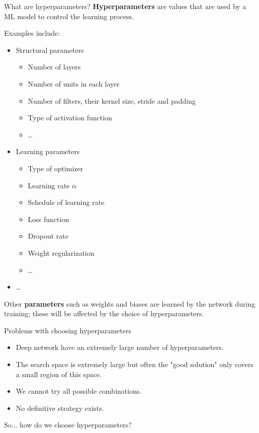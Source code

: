 \documentclass[9pt, aspectratio=169]{beamer}
\begin{document}
\begin{frame}
    {What are hyperparameters?}
    \textbf{Hyperparameters} are values that are used by a ML model to control the learning process.

    Examples include:
    \begin{itemize}
        \item Structural parameters
              \begin{itemize}
                  \item Number of layers
                  \item Number of units in each layer
                  \item Number of filters, their kernel size, stride and padding
                  \item Type of activation function
                  \item \dots
              \end{itemize}
        \item Learning parameters
              \begin{itemize}
                  \item Type of optimizer
                  \item Learning rate $\alpha$
                  \item Schedule of learning rate
                  \item Loss function
                  \item Dropout rate
                  \item Weight regularization
                  \item \dots
              \end{itemize}
        \item \dots
    \end{itemize}

    \pause

    Other \textbf{parameters} such as weights and biases are learned by the network during training; these will be affected by the choice of hyperparameters.
\end{frame}

\begin{frame}
    {Problems with choosing hyperparameters}

    \begin{itemize}
        \item Deep network have an extremely large number of hyperparameters.
        \item The search space is extremely large but often the "good solution" only covers a small region of this space.
        \item We cannot try all possible combinations.
        \item No definitive strategy exists.
    \end{itemize}

    So... how do we choose hyperparameters?
\end{frame}
\end{document}

